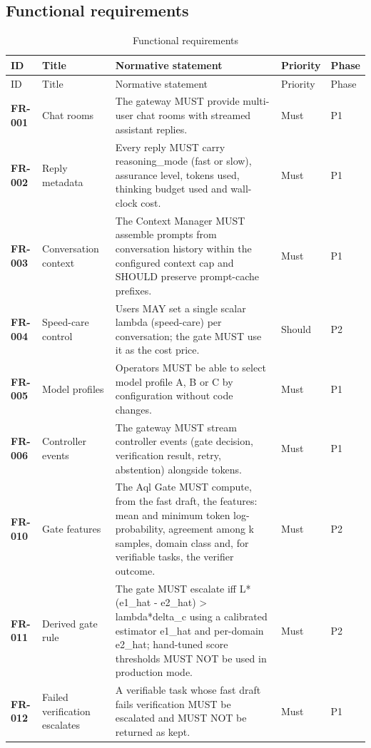 \subsection{Functional requirements}
\begin{longtable}{@{}p{1.45cm}p{2.5cm}p{8.1cm}p{1.6cm}p{1.1cm}@{}}
\caption{Functional requirements}\\
\toprule ID & Title & Normative statement & Priority & Phase\\\midrule\endfirsthead
\toprule ID & Title & Normative statement & Priority & Phase\\\midrule\endhead
\bottomrule\endfoot
\textbf{FR-001} & Chat rooms & The gateway MUST provide multi-user chat rooms with streamed assistant replies. & Must & P1\\
\textbf{FR-002} & Reply metadata & Every reply MUST carry reasoning\_mode (fast or slow), assurance level, tokens used, thinking budget used and wall-clock cost. & Must & P1\\
\textbf{FR-003} & Conversation context & The Context Manager MUST assemble prompts from conversation history within the configured context cap and SHOULD preserve prompt-cache prefixes. & Must & P1\\
\textbf{FR-004} & Speed-care control & Users MAY set a single scalar lambda (speed-care) per conversation; the gate MUST use it as the cost price. & Should & P2\\
\textbf{FR-005} & Model profiles & Operators MUST be able to select model profile A, B or C by configuration without code changes. & Must & P1\\
\textbf{FR-006} & Controller events & The gateway MUST stream controller events (gate decision, verification result, retry, abstention) alongside tokens. & Must & P1\\
\textbf{FR-010} & Gate features & The Aql Gate MUST compute, from the fast draft, the features: mean and minimum token log-probability, agreement among k samples, domain class and, for verifiable tasks, the verifier outcome. & Must & P2\\
\textbf{FR-011} & Derived gate rule & The gate MUST escalate iff L*(e1\_hat - e2\_hat) > lambda*delta\_c using a calibrated estimator e1\_hat and per-domain e2\_hat; hand-tuned score thresholds MUST NOT be used in production mode. & Must & P2\\
\textbf{FR-012} & Failed verification escalates & A verifiable task whose fast draft fails verification MUST be escalated and MUST NOT be returned as kept. & Must & P1\\

\end{longtable}
